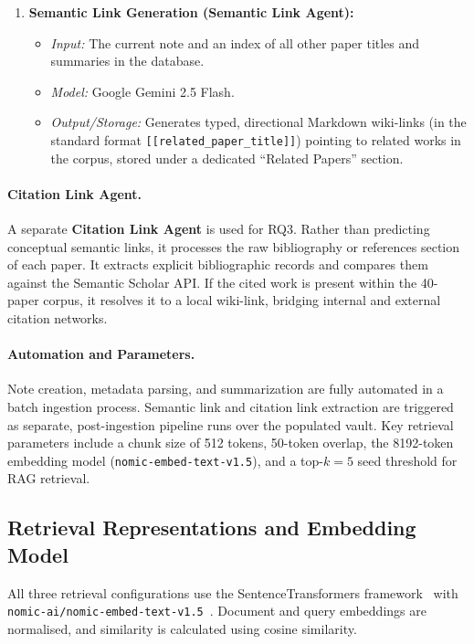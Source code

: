 \documentclass[runningheads]{llncs}
\begin{document}
\begin{enumerate}
    \item \textbf{Semantic Link Generation (Semantic Link Agent):}
    \begin{itemize}
        \item \textit{Input:} The current note and an index of all other paper titles and summaries in the database.
        \item \textit{Model:} Google Gemini 2.5 Flash.
        \item \textit{Output/Storage:} Generates typed, directional Markdown wiki-links (in the standard format \texttt{[[related\_paper\_title]]}) pointing to related works in the corpus, stored under a dedicated ``Related Papers'' section.
    \end{itemize}
\end{enumerate}

\paragraph{Citation Link Agent.}
A separate \textbf{Citation Link Agent} is used for RQ3. Rather than predicting conceptual semantic links, it processes the raw bibliography or references section of each paper. It extracts explicit bibliographic records and compares them against the Semantic Scholar API. If the cited work is present within the 40-paper corpus, it resolves it to a local wiki-link, bridging internal and external citation networks.

\paragraph{Automation and Parameters.}
Note creation, metadata parsing, and summarization are fully automated in a batch ingestion process. Semantic link and citation link extraction are triggered as separate, post-ingestion pipeline runs over the populated vault. Key retrieval parameters include a chunk size of 512 tokens, 50-token overlap, the 8192-token embedding model (\texttt{nomic-embed-text-v1.5}), and a top-$k = 5$ seed threshold for RAG retrieval.

\subsection{Retrieval Representations and Embedding Model}
\label{sec:retrieval_representations}

All three retrieval configurations use the SentenceTransformers framework~\cite{reimers2019sentence} with \texttt{nomic-ai/nomic-embed-text-v1.5}~\cite{nussbaum2024nomic}. Document and query embeddings are normalised, and similarity is calculated using cosine similarity.
\end{document}

